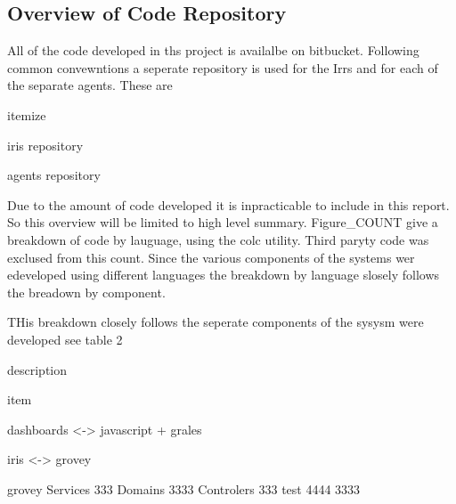 \documentclass[12pt,a4paper,titlepage]{report}
\begin{document}
\begin{appendices}


\section{Overview of Code Repository}

All of the code developed in ths project is availalbe on bitbucket. Following common convewntions a seperate repository is used for the Irrs and for each of the separate agents. These are 

 itemize
 
 iris repository
 
 agents repository 
 
Due to the amount of code developed it is inpracticable to include in this report. So this overview will be limited to high level summary.  Figure\_COUNT give a breakdown of code by lauguage, using the colc utility. Third paryty code was exclused from this count.  Since the various components of the systems wer edeveloped using different languages the breakdown by language slosely follows the breadown by component.

THis breakdown closely follows the seperate components of the sysysm were developed   
see table 2


description

item 

dashboards <-> javascript + grales 

iris <-> grovey




grovey                             
    Services             333
    Domains              3333
    Controlers           333
    test                 4444       
                                     3333


\end{appendices}
\end{document}
